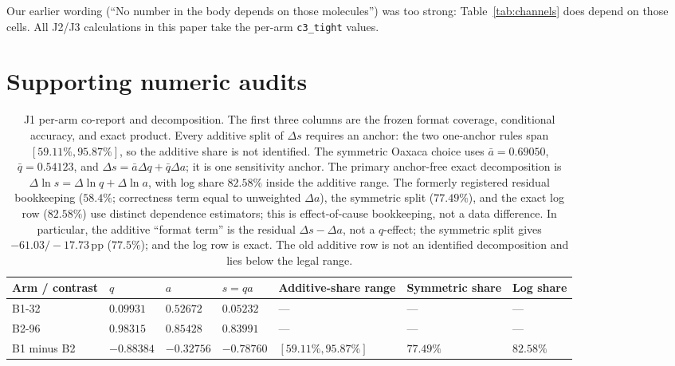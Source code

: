 \documentclass{article}
\newcommand{\pp}{\,\mathrm{pp}}
\begin{document}
Our earlier wording (``No number in the body depends on those molecules'') was
too strong: Table~\ref{tab:channels} does depend on those cells.  All J2/J3
calculations in this paper take the per-arm \texttt{c3\_tight} values.

\section{Supporting numeric audits}\label{sec:appx_supporting}

\begin{table}[H]
\centering\footnotesize
\setlength{\tabcolsep}{2pt}
\begin{tabular}{@{}>{\raggedright\arraybackslash}p{1.8cm}
                    >{\centering\arraybackslash}p{1.45cm}
                    >{\centering\arraybackslash}p{1.45cm}
                    >{\centering\arraybackslash}p{1.45cm}
                    >{\centering\arraybackslash}p{2.5cm}
                    >{\centering\arraybackslash}p{1.9cm}
                    >{\centering\arraybackslash}p{1.6cm}@{}}
\toprule
Arm / contrast & $q$ & $a$ & $s=qa$ & Additive-share range & Symmetric share & Log share \\
\midrule
\textsc{B1-32} & $0.09931$ & $0.52672$ & $0.05232$ & --- & --- & --- \\
\textsc{B2-96} & $0.98315$ & $0.85428$ & $0.83991$ & --- & --- & --- \\
B1 minus B2 & $-0.88384$ & $-0.32756$ & $-0.78760$ & $[59.11\%,95.87\%]$ & $77.49\%$ & \textbf{$82.58\%$} \\
\bottomrule
\end{tabular}
\caption{J1 per-arm co-report and decomposition.  The first three columns are
the frozen format coverage, conditional accuracy, and exact product.  Every
additive split of $\Delta s$ requires an anchor: the two one-anchor rules span
$[59.11\%,95.87\%]$, so the additive share is not identified.  The symmetric
Oaxaca choice uses $\bar a=0.69050$, $\bar q=0.54123$, and
$\Delta s=\bar a\Delta q+\bar q\Delta a$; it is one sensitivity anchor.  The
primary anchor-free exact decomposition is
$\Delta\ln s=\Delta\ln q+\Delta\ln a$, with log share $82.58\%$ inside the
additive range.  The formerly registered residual bookkeeping
($58.4\%$; correctness term equal to unweighted $\Delta a$), the symmetric
split ($77.49\%$), and the exact log row ($82.58\%$) use distinct dependence
estimators; this is effect-of-cause bookkeeping, not a data difference.  In
particular, the additive ``format term'' is the residual
$\Delta s-\Delta a$, not a $q$-effect; the symmetric split gives
$-61.03/-17.73\pp$ ($77.5\%$); and the log row is exact.  The old additive
row is not an identified decomposition and lies below the legal range.}
\label{tab:j1-decomposition}
\end{table}
\end{document}
